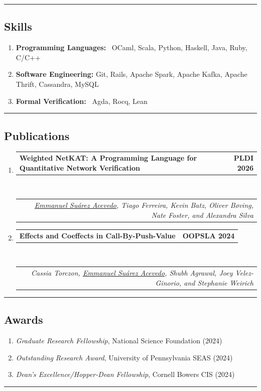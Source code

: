\documentclass[letterpaper]{article}
\makeatletter
\newcommand*{\tabulardef}[3]{\begin{tabular}[t]{@{}lp{\dimexpr\linewidth-#1}@{}}
    #2&#3
\end{tabular}}
\newcommand{\headerrow}[2]
{\begin{tabular*}{\linewidth}{l@{\extracolsep{\fill}}r}
	#1 &
	#2 \\
\end{tabular*}}
\makeatother
\begin{document}
\hrule

\subsection*{Skills}
\begin{enumerate}[label=]
	\parskip=-0.25em

	\item
    \textbf{Programming Languages:} \ OCaml, Scala, Python, Haskell, Java, Ruby, C/C++
    
    \item
    \textbf{Software Engineering:} Git, Rails, Apache Spark, Apache Kafka, Apache Thrift, Cassandra, MySQL

    \item
    \textbf{Formal Verification:} \ Agda, Rocq, Lean

\end{enumerate}

\hrule
\subsection*{Publications}
  
\begin{enumerate}[label=]
	\parskip=-0.05em
	\item
	\headerrow
        {\textbf{Weighted NetKAT: A Programming Language for Quantitative Network Verification}}
		{\textbf{PLDI 2026}}
	\\
	\headerrow
        {\tabulardef{6cm}{}{
            \emph{
                \underline{Emmanuel Suárez Acevedo},
                Tiago Ferreira,
                Kevin Batz,
                Oliver Bøving,
                Nate Foster, and
                Alexandra Silva
            }}}
        {}

	\item
	\headerrow
        {\textbf{Effects and Coeffects in Call-By-Push-Value}}
		{\textbf{OOPSLA 2024}}
	\\
	\headerrow
        {\tabulardef{6cm}{}{
            \emph{Cassia Torczon, \underline{Emmanuel Suárez Acevedo},
            Shubh Agrawal, Joey Velez-Ginorio, and Stephanie Weirich}}}
        {}
\end{enumerate}

\hrule
\subsection*{Awards}
\begin{enumerate}[label=]
       \parskip=-0.25em
   \item \emph{Graduate Research Fellowship}, National Science Foundation (2024)
   \item \emph{Outstanding Research Award}, University of Pennsylvania SEAS (2024)
    \item \emph{Dean's Excellence/Hopper-Dean Fellowship}, Cornell Bowers CIS (2024)
\end{enumerate}
\hrule
\end{document}
